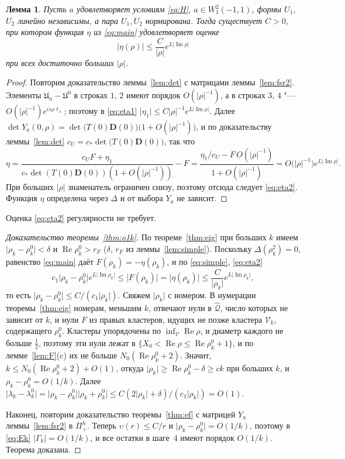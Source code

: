 \documentclass[12pt,a4paper]{article}
\numberwithin{equation}{section}
\newtheorem{lemma}{Лемма}
\theoremstyle{definition}
\newcommand{\abs}[1]{\lvert#1\rvert}
\newcommand{\Imm}{\operatorname{Im}}
\newcommand{\Ree}{\operatorname{Re}}
\newcommand{\Uf}{\mathfrak U}
\newcommand{\Dd}{\mathbf D}
\begin{document}
\begin{lemma}\label{lem:eta2}
Пусть $a$ удовлетворяет условиям \eqref{eq:H}, $a\in W^2_1(-1,1)$, формы $U_1$, $U_2$ линейно
независимы, а пара $U_1,U_2$ нормирована. Тогда существует $C>0$, при котором функция $\eta$ из \eqref{eq:main}
удовлетворяет оценке
\begin{equation}\label{eq:eta2}
 \abs{\eta(\rho)}\le\frac{C}{\abs\rho}e^{L\abs{\Imm\rho}}
\end{equation}
при всех достаточно больших $\abs\rho$.
\end{lemma}

\begin{proof}
Повторим доказательство леммы~\ref{lem:det} с матрицами леммы~\ref{lem:fsr2}. Элементы
$\Uf_a-\Uf^0$ в строках $1$, $2$ имеют порядок $O(\abs\rho^{-1})$, а в строках $3$, $4$ "---
$O(\abs\rho^{-1})e^{is\rho\ell_\pm}$; поэтому в \eqref{eq:eta1}
$\abs{\eta_1}\le C\abs\rho^{-1}e^{L\abs{\Imm\rho}}$. Далее
$\det Y_a(0,\rho)=\det\bigl(T(0)\Dd(0)\bigr)\bigl(1+O(\abs\rho^{-1})\bigr)$, и по доказательству
леммы~\ref{lem:det} $c_U=c_\ast\det\bigl(T(0)\Dd(0)\bigr)$, так что
\[
 \eta=\frac{c_UF+\eta_1}{c_\ast\det(T(0)\Dd(0))(1+O(\abs\rho^{-1}))}-F
 =\frac{\eta_1/c_U-F\,O(\abs\rho^{-1})}{1+O(\abs\rho^{-1})}
 =O\bigl(\abs\rho^{-1}\bigr)e^{L\abs{\Imm\rho}}.
\]
При больших $\abs\rho$ знаменатель ограничен снизу, поэтому отсюда следует \eqref{eq:eta2}. Функция
$\eta$ определена через $\Delta$ и от выбора $Y_a$ не зависит.
\end{proof}

Оценка \eqref{eq:eta2} регулярности не требует.

\begin{proof}[Доказательство теоремы~\ref{thm:o1k}]
По теореме~\ref{thm:eig} при больших $k$ имеем $\abs{\rho_k-\rho_k^0}<\delta$ и
$\Ree\rho_k^0>r_F$ ($\delta$, $r_F$ из леммы~\ref{lem:simple}). Поскольку $\Delta(\rho_k^2)=0$,
равенство \eqref{eq:main} даёт $F(\rho_k)=-\eta(\rho_k)$, и по \eqref{eq:simple}, \eqref{eq:eta2}
\[
 c_1\abs{\rho_k-\rho_k^0}e^{L\abs{\Imm\rho_k}}\le\abs{F(\rho_k)}=\abs{\eta(\rho_k)}
 \le\frac{C}{\abs{\rho_k}}e^{L\abs{\Imm\rho_k}},
\]
то есть $\abs{\rho_k-\rho_k^0}\le C/(c_1\abs{\rho_k})$. Свяжем $\abs{\rho_k}$ с номером. В нумерации
теоремы~\ref{thm:eig} номерам, меньшим $k$, отвечают нули в
$\widehat{\mathcal Q}$, число которых не зависит от $k$, и нули $F$ из правых кластеров, идущих не позже кластера $\mathcal V_k$,
содержащего $\rho_k^0$. Кластеры упорядочены по $\inf_{\mathcal V}\Ree\rho$, и диаметр каждого не
больше $\frac12$, поэтому эти нули лежат в $\{X_0<\Ree\rho\le\Ree\rho_k^0+1\}$, и по
лемме~\ref{lem:F}(c) их не больше $N_0(\Ree\rho_k^0+2)$. Значит,
$k\le N_0(\Ree\rho_k^0+2)+O(1)$, откуда $\abs{\rho_k}\ge\Ree\rho_k^0-\delta\ge ck$ при
больших $k$, и $\rho_k-\rho_k^0=O(1/k)$. Далее
$\abs{\lambda_k-\lambda_k^0}=\abs{\rho_k-\rho_k^0}\abs{\rho_k+\rho_k^0}\le
C(2\abs{\rho_k}+\delta)/(c_1\abs{\rho_k})=O(1)$.

Наконец, повторим доказательство теоремы~\ref{thm:ef} с матрицей $Y_a$ леммы~\ref{lem:fsr2} в
$\Pi^h_+$. Теперь $\upsilon(r)\le C/r$ и $\abs{\rho_k-\rho_k^0}=O(1/k)$, поэтому в \eqref{eq:Ek}
$\abs{\Gamma_k}=O(1/k)$, и все остатки в шаге~4 имеют порядок $O(1/k)$.
Теорема доказана.
\end{proof}
\end{document}
